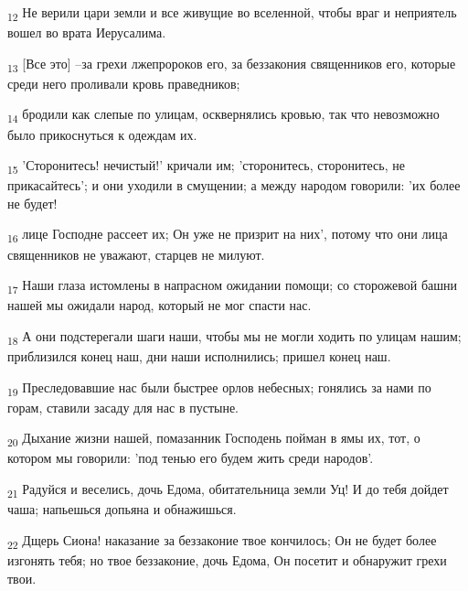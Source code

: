 \begin{tcolorbox}
\textsubscript{12} Не верили цари земли и все живущие во вселенной, чтобы враг и неприятель вошел во врата Иерусалима.
\end{tcolorbox}
\begin{tcolorbox}
\textsubscript{13} [Все это] --за грехи лжепророков его, за беззакония священников его, которые среди него проливали кровь праведников;
\end{tcolorbox}
\begin{tcolorbox}
\textsubscript{14} бродили как слепые по улицам, осквернялись кровью, так что невозможно было прикоснуться к одеждам их.
\end{tcolorbox}
\begin{tcolorbox}
\textsubscript{15} 'Сторонитесь! нечистый!' кричали им; 'сторонитесь, сторонитесь, не прикасайтесь'; и они уходили в смущении; а между народом говорили: 'их более не будет!
\end{tcolorbox}
\begin{tcolorbox}
\textsubscript{16} лице Господне рассеет их; Он уже не призрит на них', потому что они лица священников не уважают, старцев не милуют.
\end{tcolorbox}
\begin{tcolorbox}
\textsubscript{17} Наши глаза истомлены в напрасном ожидании помощи; со сторожевой башни нашей мы ожидали народ, который не мог спасти нас.
\end{tcolorbox}
\begin{tcolorbox}
\textsubscript{18} А они подстерегали шаги наши, чтобы мы не могли ходить по улицам нашим; приблизился конец наш, дни наши исполнились; пришел конец наш.
\end{tcolorbox}
\begin{tcolorbox}
\textsubscript{19} Преследовавшие нас были быстрее орлов небесных; гонялись за нами по горам, ставили засаду для нас в пустыне.
\end{tcolorbox}
\begin{tcolorbox}
\textsubscript{20} Дыхание жизни нашей, помазанник Господень пойман в ямы их, тот, о котором мы говорили: 'под тенью его будем жить среди народов'.
\end{tcolorbox}
\begin{tcolorbox}
\textsubscript{21} Радуйся и веселись, дочь Едома, обитательница земли Уц! И до тебя дойдет чаша; напьешься допьяна и обнажишься.
\end{tcolorbox}
\begin{tcolorbox}
\textsubscript{22} Дщерь Сиона! наказание за беззаконие твое кончилось; Он не будет более изгонять тебя; но твое беззаконие, дочь Едома, Он посетит и обнаружит грехи твои.
\end{tcolorbox}
